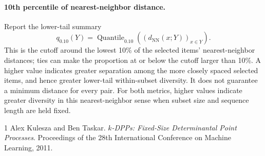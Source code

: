 \documentclass[11pt]{article}
\begin{document}
\paragraph{10th percentile of nearest-neighbor distance.}
Report the lower-tail summary
\begin{equation}
  q_{0.10}(Y)=\operatorname{Quantile}_{0.10}
    \!\left((d_{\mathrm{NN}}(x;Y))_{x\in Y}\right).
  \label{eq:baseline-nn-tenth-percentile}
\end{equation}
This is the cutoff around the lowest 10\% of the selected items'
nearest-neighbor distances; ties can make the proportion at or below the
cutoff larger than 10\%. A higher value indicates greater separation among
the more closely spaced selected items, and hence greater lower-tail
within-subset diversity. It does not guarantee a minimum distance for every
pair. For both metrics, higher values indicate greater diversity in this
nearest-neighbor sense when subset size and sequence length are held fixed.


\begin{thebibliography}{1}
Alex Kulesza and Ben Taskar.
\emph{$k$-DPPs: Fixed-Size Determinantal Point Processes}.
Proceedings of the 28th International Conference on Machine Learning, 2011.
\end{thebibliography}
\end{document}
